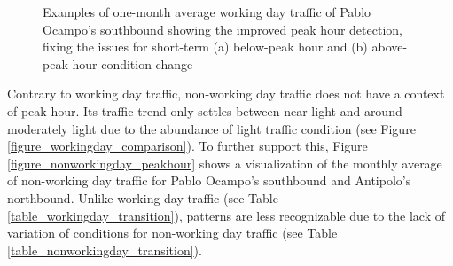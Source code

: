 \begin{figure}[h] 
\centering
    \centering
      \captionsetup{justification=centering}
    \hfill
    \caption{Examples of one-month average working day traffic of Pablo Ocampo’s southbound showing the improved peak hour detection, fixing the issues for short-term (a) below-peak hour and (b) above-peak hour condition change}

    \label{figure_peakhour_solution}
\end{figure}



Contrary to working day traffic, non-working day traffic does not have a context of peak hour. Its traffic trend only settles between near light and around moderately light due to the abundance of light traffic condition (see Figure \ref{figure_workingday_comparison}). To further support this, Figure \ref{figure_nonworkingday_peakhour} shows a visualization of the monthly average of non-working day traffic for Pablo Ocampo’s southbound and Antipolo’s northbound. Unlike working day traffic (see Table \ref{table_workingday_transition}), patterns are less recognizable due to the lack of variation of conditions for non-working day traffic (see Table \ref{table_nonworkingday_transition}).

